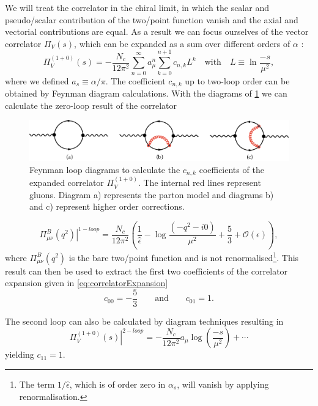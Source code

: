 \documentclass[../../index.tex]{subfiles}
\begin{document}
We will treat the correlator in the chiral limit, in which the scalar and
pseudo\-/scalar contribution of the two\-/point function vanish and the axial
and vectorial contributions are equal. As a result we can focus ourselves of the
vector correlator \(\Pi_V(s)\), which can be expanded as a sum over different
orders of \(\alpha\) \cite{Beneke2008}:
\begin{equation}
  \label{eq:correlatorExpansion}
  \Pi_V^{(1+0)}(s) = - \frac{N_c}{12 \pi^2} \sum_{n=0}^\infty a_\mu^n \sum_{k=0}^{n+1} c_{n,k} L^{k} \quad \text{with} \quad L \equiv \ln \frac{-s}{\mu^2},
\end{equation}
where we defined \(a_s \equiv \alpha/ \pi\). The coefficient \(c_{n,k}\) up to
two-loop order can be obtained by Feynman diagram calculations. With the
diagrams of \cref{fig:perturbativeContributionFeynmanDiagrams} we can calculate
the zero-loop result of the correlator \cite{Jamin2006}
\begin{figure}
  \centering
  \includegraphics[width=\textwidth]{./images/correlatorLoopDiagrams.eps}
  \caption{Feynman loop diagrams to calculate the \(c_{n,k}\) coefficients of
    the expanded correlator \(\Pi_V^{(1+0)}\). The internal red lines represent
    gluons. Diagram a) represents the parton model and diagrams b) and c)
    represent higher order corrections.}
  \label{fig:perturbativeContributionFeynmanDiagrams}
\end{figure}
\begin{equation}
  \left. \Pi^B_{\mu\nu}(q^2) \right\rvert^{1-loop} = \frac{N_c}{12\pi^2} \left( \frac{1}{\hat \epsilon} - \log\frac{(-q^2 - i0)}{\mu^2} + \frac{5}{3} + \mathcal{O}(\epsilon) \right),
\end{equation}
where \(\Pi^B_{\mu\nu}(q^2)\) is the bare two\-/point function and is not
renormalised\footnote{The term \(1/ \hat \epsilon\), which is of order zero in
  \(\alpha_s\), will vanish by applying renormalisation.}. This result can then
be used to extract the first two coefficients of the correlator expansion given
in \cref{eq:correlatorExpansion}
\begin{equation}
  c_{00} = - \frac{5}{3} \qquad \text{and} \qquad c_{01} = 1.
\end{equation}

The second loop can also be calculated by diagram techniques resulting in
\cite{Boito2011}
\begin{equation}
  \left. \Pi_V^{(1+0)}(s) \right\rvert^{2-loop} = -\frac{N_c}{12\pi^2} a_\mu \log(\frac{-s}{\mu^2}) + \cdots
\end{equation}
yielding $c_{11} = 1$.
\end{document}
